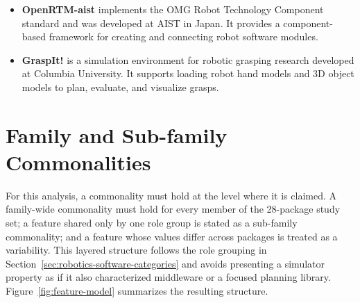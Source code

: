 \begin{itemize}
    \item \textbf{OpenRTM-\allowbreak aist} implements the OMG Robot Technology Component standard and was developed at AIST in Japan. It provides a component-based framework for creating and connecting robot software modules.
    \item \textbf{GraspIt!} is a simulation environment for robotic grasping research developed at Columbia University. It supports loading robot hand models and 3D object models to plan, evaluate, and visualize grasps.
\end{itemize}

\section{Family and Sub-family Commonalities}
\label{sec:commonalities}

For this analysis, a commonality must hold at the level where it is claimed. A family-wide commonality must hold for every member of the 28-package study set; a feature shared only by one role group is stated as a sub-family commonality; and a feature whose values differ across packages is treated as a variability. This layered structure follows the role grouping in Section~\ref{sec:robotics-software-categories} and avoids presenting a simulator property as if it also characterized middleware or a focused planning library. Figure~\ref{fig:feature-model} summarizes the resulting structure.

